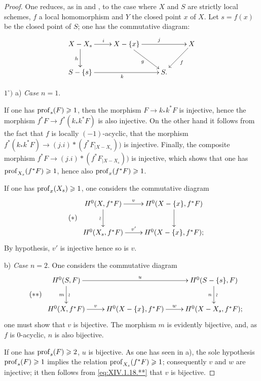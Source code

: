\begin{proof}
One reduces, as in  and , to the case where $X$ and $S$ are strictly local schemes, $f$ a local homomorphism and $Y$ the closed point $x$ of $X$. Let $s=f(x)$ be the closed point of $S$; one has the commutative diagram:
$$
\xymatrix{ X-X_s\ar[r]^i\ar[d]_h&X-\{x\}\ar[rd]_g\ar[rr]^j&&X\ar[ld]^f\\
S-\{s\}\ar[rr]_k&&S. }$$

$1^\circ)$ a) \textit{Case} $n=1$.

If one has $\operatorname{prof}_s(F)\geqslant 1$, then the morphism $F\to k_*k^*F$ is injective, hence the morphism $f^*F\to f^*(k_*k^*F)$ is also injective. On the other hand it follows from the fact that $f$ is locally $(-1)$-acyclic, that the morphism $f^*(k_*k^*F)\to (j.i)*(f^*F_{|X-X_s}))$ is injective. Finally, the composite morphism $f^*F\to (j.i)*(f^*F_{|X-X_s}))$ is injective, which shows that one has $\operatorname{prof}_{X_s}(f^*F)\geqslant 1$, hence also $\operatorname{prof}_x(f^*F)\geqslant 1$.

If one has $\operatorname{prof}_x(X_s)\geqslant 1$, one considers the commutative diagram
\begin{equation*} \label{eq:XIV.18.*} \tag{$*$}
\begin{array}{c}
\xymatrix{
H^0(X, f^*F)\ar[r]^-{v}\ar[d]_\wr&H^0(X-\{x\}, f^*F)\ar[d]\\
H^0(X_s, f^*F)\ar[r]^-{v'}&H^0(X-\{x\}, f^*F);
}
\end{array}
\end{equation*}
By hypothesis, $v'$ is injective hence so is $v$.

b) \textit{Case} $n=2$. One considers the commutative diagram
\begin{equation*} \label{eq:XIV.1.18.**} \tag{$**$}
\begin{array}{c}
\xymatrix{ H^0(S, F)\ar[d]_{m}^{\wr}\ar[rr]^u&&H^0(S-\{s\}, F)\ar[d]^{\wr}_{ n}\\
H^0(X, f^*F)\ar[r]^-v&H^0(X-\{x\}, f^*F)\ar[r]^w&H^0(X-X_s, f^*F);
}
\end{array}
\end{equation*}
one must show that $v$ is bijective. The morphism $m$ is evidently bijective, and, as $f$ is $0$-acyclic, $n$ is also bijective.

If one has $\operatorname{prof}_s(F)\geqslant 2$, $u$ is bijective. As one has seen in a), the sole hypothesis $\operatorname{prof}_s(F)\geqslant 1$ implies the relation $\operatorname{prof}_{X_s}(f^*F)\geqslant 1$; consequently $v$ and $w$ are injective; it then follows from \eqref{eq:XIV.1.18.**} that $v$ is bijective.


\end{proof}
